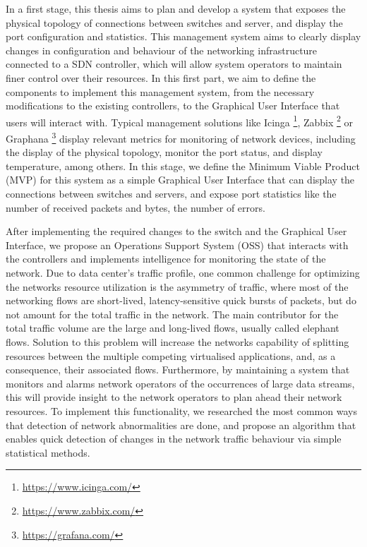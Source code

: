 In a first stage, this thesis aims to plan and develop a system that exposes the physical topology of connections between switches and server, and display
the port configuration and statistics. This management system aims to clearly display changes in configuration and behaviour of the networking infrastructure
connected to a SDN controller, which will allow system operators to maintain finer control over their resources. In this first part, we aim to define the 
components to implement this management system, from the necessary modifications to the existing controllers, to the Graphical User Interface that users will 
interact with. Typical management solutions like Icinga \footnote{\url{https://www.icinga.com/}}, Zabbix \footnote{\url{https://www.zabbix.com/}} or
Graphana \footnote{\url{https://grafana.com/}} display relevant metrics for monitoring of network devices, including the display of the
physical topology, monitor the port status, and display temperature, among others. In this stage, we define the Minimum Viable Product (MVP) for this system as a
simple Graphical User Interface that can display the connections between switches and servers, and expose port statistics like the number of received packets
and bytes, the number of errors.

\par After implementing the required changes to the switch and the Graphical User Interface, we propose an Operations Support System (OSS) that interacts with the
controllers and implements intelligence for monitoring the state of the network. Due to data center's traffic profile, one common challenge for optimizing the
networks resource utilization is the asymmetry of traffic, where most of the networking flows are short-lived, latency-sensitive quick bursts of packets, but do not
amount for the total traffic in the network. The main contributor for the total traffic volume are the large and long-lived flows, usually called elephant flows.
Solution to this problem will increase the networks capability of splitting resources between the multiple competing virtualised applications, and, as a consequence,
their associated flows. Furthermore, by maintaining a system that monitors and alarms network operators of the occurrences of large data streams, this will provide
insight to the network operators to plan ahead their network resources. To implement this functionality, we researched the most common ways that detection of network
abnormalities are done, and propose an algorithm that enables quick detection of changes in the network traffic behaviour via simple statistical methods.

